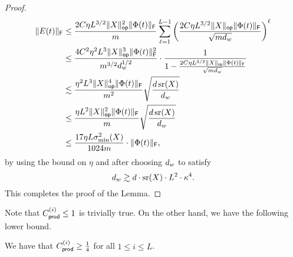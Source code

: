 \begin{proof}
\begin{align*}
  \lVert E(t)\rVert_{\mathsf{F}}
  &\leq
  \frac{2 C \eta L^{3/2} \lVert X\rVert_{\mathsf{op}}^2 \lVert\Phi(t)\rVert_{\mathsf{F}}}{m}
  \sum_{\ell = 1}^{L - 1} \left(
    \frac{2 C \eta L^{3/2} \lVert X\rVert_{\mathsf{op}} \lVert\Phi(t)\rVert_{\mathsf{F}}}{\sqrt{m d_{w}}}
  \right)^{\ell}
  \\
  &\leq
  \frac{4 C^2 \eta^2 L^3 \lVert X\rVert_{\mathsf{op}}^3 \lVert\Phi(t)\rVert_{\mathsf{F}}^2}{m^{3/2} d_{w}^{1/2}}
  \cdot \frac{1}{1 - \frac{2 C \eta L^{3/2} \lVert X\rVert_{\mathsf{op}} \lVert\Phi(t)\rVert_{\mathsf{F}}}{\sqrt{m d_{w}}}}
  \\
  &\lesssim
  \frac{ \eta^2 L^{3} \lVert X\rVert_{\mathsf{op}}^4 \lVert\Phi(t)\rVert_{\mathsf{F}}}{ m^2} \sqrt{\frac{d \operatorname{\mathrm{sr}}(X)}{d_{w}}}
  \\
  &\leq
  \frac{ \eta L^2 \lVert X\rVert_{\mathsf{op}}^2 \lVert\Phi(t)\rVert_{\mathsf{F}}}{ m} \sqrt{\frac{d \operatorname{\mathrm{sr}}(X)}{d_{w}}} \\
  &\leq
  \frac{17 \eta L \sigma_{\min}^2(X)}{1024 m} \cdot \lVert\Phi(t)\rVert_{\mathsf{F}},
\end{align*}
by using the bound on $\eta$ and
after choosing $d_{w}$ to satisfy
\[
  d_{w} \gtrsim d \cdot \operatorname{\mathrm{sr}}(X) \cdot L^2 \cdot \kappa^4.
\]
This completes the proof of the Lemma.
\end{proof}
Note that $C_{\mathsf{prod}}^{({i})} \leq 1$ is trivially true. On the other hand, we have the
following lower bound.
\begin{lemma}
    \label{lemma:cprod-i-lb}
    We have that
    $C_{\mathsf{prod}}^{({i})} \geq \frac{1}{4}$ for all $1 \leq i \leq L$.
\end{lemma}
